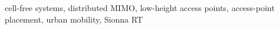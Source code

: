 \documentclass[conference]{IEEEtran}
\begin{document}
\begin{IEEEkeywords}
cell-free systems, distributed MIMO, low-height access points, access-point placement, urban mobility, Sionna RT
\end{IEEEkeywords}

\glsresetall









% 



\printbibliography
\end{document}
